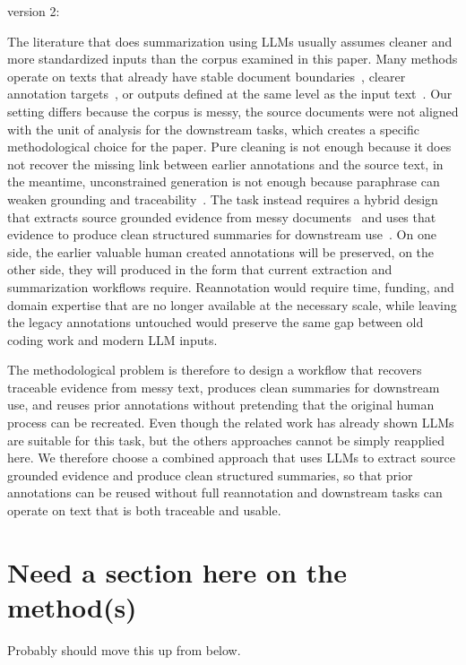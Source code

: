 \documentclass{article}
\begin{document}
version 2:

The literature that does summarization using LLMs usually assumes cleaner and more standardized inputs than the corpus examined in this paper. Many methods operate on texts that already have stable document boundaries~\cite{Choi_etal2024}, clearer annotation targets~\cite{Ma_etal2023}, or outputs defined at the same level as the input text~\cite{Zhang_etal2024}. Our setting differs because the corpus is messy, the source documents were not aligned with the unit of analysis for the downstream tasks, which creates a specific methodological choice for the paper. Pure cleaning is not enough because it does not recover the missing link between earlier annotations and the source text, in the meantime, unconstrained generation is not enough because paraphrase can weaken grounding and traceability~\cite{Brandt_etal2025}. The task instead requires a hybrid design that extracts source grounded evidence from messy documents~\cite{Dagdelen_etal2024} and uses that evidence to produce clean structured summaries for downstream use~\cite{olsen-etal-2024-socio}. On one side, the earlier valuable human created annotations will be preserved, on the other side, they will produced in the form that current extraction and summarization workflows require. Reannotation would require time, funding, and domain expertise that are no longer available at the necessary scale, while leaving the legacy annotations untouched would preserve the same gap between old coding work and modern LLM inputs.

The methodological problem is therefore to design a workflow that recovers traceable evidence from messy text, produces clean summaries for downstream use, and reuses prior annotations without pretending that the original human process can be recreated. Even though the related work has already shown LLMs are suitable for this task, but the others approaches cannot be simply reapplied here. We therefore choose a combined approach that uses LLMs to extract source grounded evidence and produce clean structured summaries, so that prior annotations can be reused without full reannotation and downstream tasks can operate on text that is both traceable and usable.

\section{Need a section here on the method(s)}

Probably should move this up from below.
\end{document}
